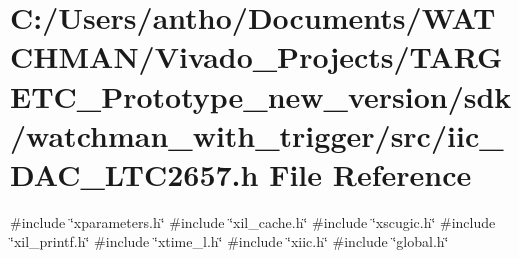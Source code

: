 \section{C\+:/\+Users/antho/\+Documents/\+W\+A\+T\+C\+H\+M\+A\+N/\+Vivado\+\_\+\+Projects/\+T\+A\+R\+G\+E\+T\+C\+\_\+\+Prototype\+\_\+new\+\_\+version/sdk/watchman\+\_\+with\+\_\+trigger/src/iic\+\_\+\+D\+A\+C\+\_\+\+L\+T\+C2657.h File Reference}
\label{iic___d_a_c___l_t_c2657_8h}
{\ttfamily \#include \char`\"{}xparameters.\+h\char`\"{}}\newline
{\ttfamily \#include \char`\"{}xil\+\_\+cache.\+h\char`\"{}}\newline
{\ttfamily \#include \char`\"{}xscugic.\+h\char`\"{}}\newline
{\ttfamily \#include \char`\"{}xil\+\_\+printf.\+h\char`\"{}}\newline
{\ttfamily \#include \char`\"{}xtime\+\_\+l.\+h\char`\"{}}\newline
{\ttfamily \#include \char`\"{}xiic.\+h\char`\"{}}\newline
{\ttfamily \#include \char`\"{}global.\+h\char`\"{}}\newline
